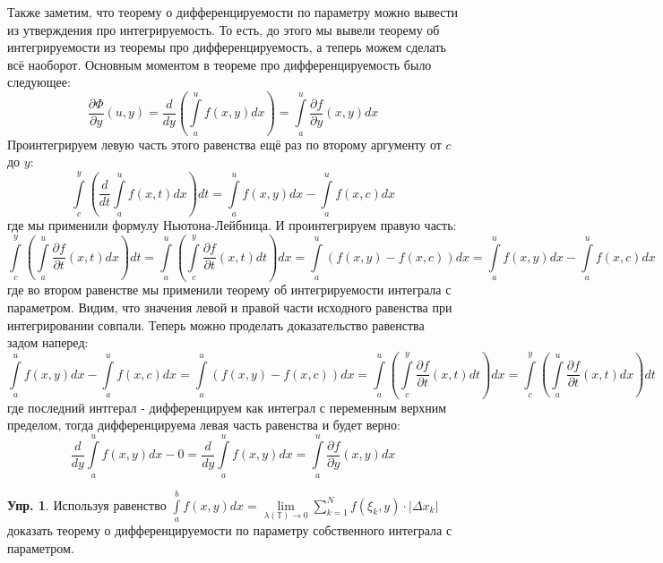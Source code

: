 \documentclass[12pt]{article}
\newcommand{\MTB}{\mathbb{T}}
\theoremstyle{definition}
\newtheorem{exrc}{Упр.}
\newcommand{\ddsum}[2]{\displaystyle\sum\limits_{#1}^{#2}}
\newcommand{\ddint}[2]{\displaystyle\int\limits_{#1}^{#2}}
\begin{document}
Также заметим, что теорему о дифференцируемости по параметру можно вывести из утверждения про интегрируемость. То есть, до этого мы вывели теорему об интегрируемости из теоремы про дифференцируемость, а теперь можем сделать всё наоборот. Основным моментом в теореме про дифференцируемость было следующее:
$$
	\dfrac{\partial \Phi}{\partial y}(u,y) = \dfrac{d}{dy}\left(\ddint{a}{u}f(x,y)dx \right)=  \ddint{a}{u}\dfrac{\partial f}{\partial y}(x,y)dx
$$
Проинтегрируем левую часть этого равенства ещё раз по второму аргументу от $c$ до $y$:
$$
	\ddint{c}{y}\left(\dfrac{d}{dt}\ddint{a}{u}f(x,t)dx\right) dt = \ddint{a}{u}f(x,y) dx - \ddint{a}{u}f(x,c)dx
$$
где мы применили формулу Ньютона-Лейбница. И проинтегрируем правую часть:
$$
	\ddint{c}{y}\left(\ddint{a}{u}\dfrac{\partial f}{\partial t}(x,t)dx\right)dt = \ddint{a}{u}\left(\ddint{c}{y}\dfrac{\partial f}{\partial t}(x,t) dt\right)dx = \ddint{a}{u}(f(x,y) - f(x,c))dx = \ddint{a}{u}f(x,y) dx - \ddint{a}{u}f(x,c)dx
$$
где во втором равенстве мы применили теорему об интегрируемости интеграла с параметром. Видим, что значения левой и правой части исходного равенства при интегрировании совпали. Теперь можно проделать доказательство равенства задом наперед:
$$
	\ddint{a}{u}f(x,y) dx - \ddint{a}{u}f(x,c)dx = \ddint{a}{u}(f(x,y) - f(x,c))dx = \ddint{a}{u}\left(\ddint{c}{y}\dfrac{\partial f}{\partial t}(x,t) dt\right)dx
	= \ddint{c}{y}\left(\ddint{a}{u}\dfrac{\partial f}{\partial t}(x,t)dx\right)dt
$$
где последний интгерал - дифференцируем как интеграл с переменным верхним пределом, тогда дифференцируема левая часть равенства и будет верно:
$$ 
	\dfrac{d}{dy}\ddint{a}{u}f(x,y)dx - 0 = \dfrac{d}{dy}\ddint{a}{u}f(x,y)dx=  \ddint{a}{u}\dfrac{\partial f}{\partial y}(x,y)dx
$$
\newpage
\begin{exrc}
	Используя равенство $\ddint{a}{b}f(x,y)dx = \lim\limits_{\lambda(\MTB) \to 0}\ddsum{k = 1}{N}f(\xi_k,y){\cdot}|\Delta x_k|$ доказать теорему о дифференцируемости по параметру собственного интеграла с параметром.
\end{exrc}
\end{document}

